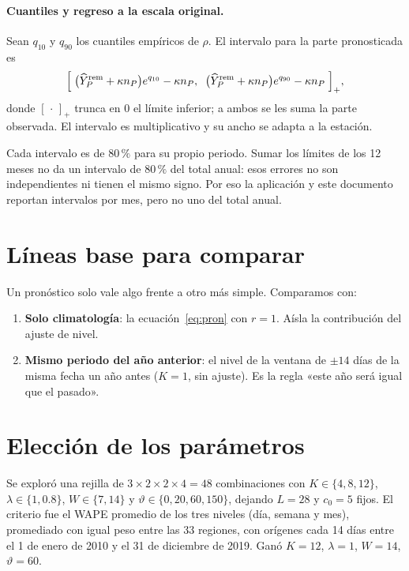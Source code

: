 \paragraph{Cuantiles y regreso a la escala original.} Sean $q_{10}$ y $q_{90}$ los cuantiles empíricos de $\rho$. El intervalo para la parte pronosticada es
\begin{align*}
  \Bigl[\;\bigl(\widehat Y^{\mathrm{rem}}_P+\kappa n_P\bigr)e^{q_{10}}-\kappa n_P,\;\;\bigl(\widehat Y^{\mathrm{rem}}_P+\kappa n_P\bigr)e^{q_{90}}-\kappa n_P\;\Bigr]_{+},
\end{align*}
donde $[\,\cdot\,]_+$ trunca en 0 el límite inferior; a ambos se les suma la parte observada. El intervalo es multiplicativo y su ancho se adapta a la estación.

\begin{cuidado}
Cada intervalo es de $80\,\%$ para su propio periodo. Sumar los límites de los 12 meses no da un intervalo de $80\,\%$ del total anual: esos errores no son independientes ni tienen el mismo signo. Por eso la aplicación y este documento reportan intervalos por mes, pero no uno del total anual.
\end{cuidado}

\section{Líneas base para comparar}

Un pronóstico solo vale algo frente a otro más simple. Comparamos con:

\begin{enumerate}[label=\arabic*)]
  \item \textbf{Solo climatología}: la ecuación~\eqref{eq:pron} con $r=1$. Aísla la contribución del ajuste de nivel.
  \item \textbf{Mismo periodo del año anterior}: el nivel de la ventana de $\pm14$ días de la misma fecha un año antes ($K=1$, sin ajuste). Es la regla «este año será igual que el pasado».
\end{enumerate}

\section{Elección de los parámetros}

Se exploró una rejilla de $3\times2\times2\times4=48$ combinaciones con $K\in\{4,8,12\}$, $\lambda\in\{1,0.8\}$, $W\in\{7,14\}$ y $\vartheta\in\{0,20,60,150\}$, dejando $L=28$ y $c_0=5$ fijos. El criterio fue el WAPE promedio de los tres niveles (día, semana y mes), promediado con igual peso entre las 33 regiones, con orígenes cada 14 días entre el 1 de enero de 2010 y el 31 de diciembre de 2019. Ganó $K=12$, $\lambda=1$, $W=14$, $\vartheta=60$.

